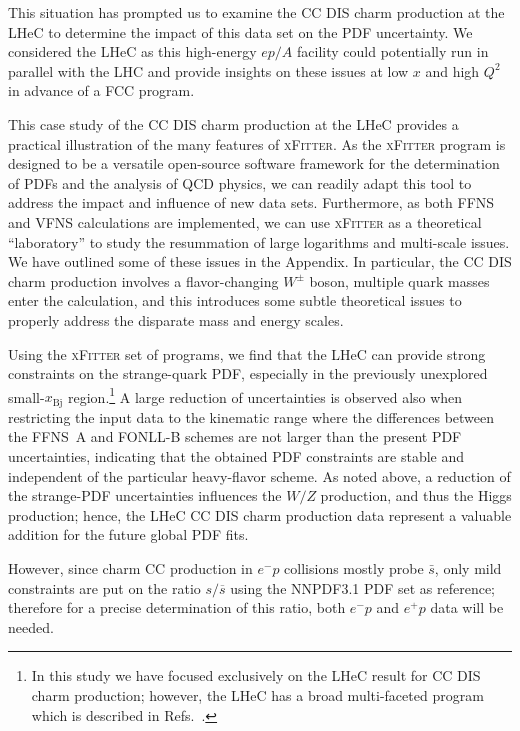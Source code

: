 \documentclass[pdftex,twocolumn,epjc3]{svjour3}          %
\newcommand{\xfitter} {\textsc{xFitter}\xspace}
\newcommand{\xbj}{\ensuremath{x_{\text{Bj}}}\xspace}
\newcommand{\fonll} {{FONLL-B}\xspace}
\newcommand{\ffns} {{FFNS~A}\xspace}
\newcommand\new[1]{{\color{blue} #1}}
\begin{document}
This situation  has  prompted us to examine the CC DIS charm production at
the LHeC to determine the impact of this data set on the PDF
uncertainty.
%
We considered the LHeC  as this  high-energy $ep/A$
facility  could potentially run in parallel with the LHC and
provide insights on these issues at low $x$ and high $Q^2$ in advance of a FCC program.



%
This case study of the CC DIS charm production at the LHeC provides a
practical illustration of the many features of \xfitter.
%
As the \xfitter program is designed to be a versatile open-source
software framework for the determination of PDFs and the analysis of
QCD physics, we can readily adapt this tool to address the impact and
influence of new data sets.
%
Furthermore, as both FFNS and VFNS calculations are implemented, we
can use \xfitter as a theoretical ``laboratory'' to study the
resummation of large logarithms and multi-scale issues.
%
We have outlined some of these issues in the Appendix.
%
In particular, the CC DIS charm production involves a flavor-changing
$W^\pm$ boson, multiple quark masses enter the calculation, and this
introduces some subtle theoretical issues to properly address the
disparate mass and energy scales.





%
Using the \xfitter set of programs, 
we find that the LHeC can provide strong constraints on the
strange-quark PDF, especially in the previously unexplored small-\xbj
region.\footnote{In this study we have focused exclusively on the LHeC
  result for CC DIS charm production; however, the LHeC has a broad
  multi-faceted program which is described in
  Refs.~\cite{AbelleiraFernandez:2012ty,Klein:2018rhq}.}
%
\new{A large reduction of uncertainties is observed also when restricting 
the input data to the kinematic range where the differences between the \ffns and 
\fonll schemes are not larger than the present PDF uncertainties, indicating 
that the obtained  PDF constraints are stable and 
independent of the particular heavy-flavor scheme.}
As noted above, a reduction of the strange-PDF uncertainties
influences the $W/Z$ production, and thus the Higgs production; hence,
the LHeC CC DIS charm production data represent a valuable addition
for the future global PDF fits.


\new{However, since charm CC production in $e^{-}p$ 
collisions mostly probe $\bar{s}$, only mild constraints are put on
the ratio $s/\overline{s}$ 
using the NNPDF3.1 PDF set as reference; therefore for a precise 
determination of this ratio, both $e^{-}p$ and $e^{+}p$ data will be needed.}
\end{document}
